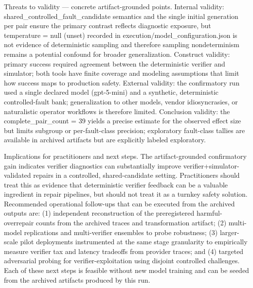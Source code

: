 \documentclass[conference]{IEEEtran}
\begin{document}
Threats to validity --- concrete artifact-grounded points. Internal validity: shared\_controlled\_fault\_candidate semantics and the single initial generation per pair ensure the primary contrast reflects diagnostic exposure, but temperature = null (unset) recorded in execution/model\_configuration.json is not evidence of deterministic sampling and therefore sampling nondeterminism remains a potential confound for broader generalization. Construct validity: primary success required agreement between the deterministic verifier and simulator; both tools have finite coverage and modeling assumptions that limit how success maps to production safety. External validity: the confirmatory run used a single declared model (gpt-5-mini) and a synthetic, deterministic controlled-fault bank; generalization to other models, vendor idiosyncrasies, or naturalistic operator workflows is therefore limited. Conclusion validity: the complete\_pair\_count = 39 yields a precise estimate for the observed effect size but limits subgroup or per-fault-class precision; exploratory fault-class tallies are available in archived artifacts but are explicitly labeled exploratory.

Implications for practitioners and next steps. The artifact-grounded confirmatory gain indicates verifier diagnostics can substantially improve verifier+simulator-validated repairs in a controlled, shared-candidate setting. Practitioners should treat this as evidence that deterministic verifier feedback can be a valuable ingredient in repair pipelines, but should not treat it as a turnkey safety solution. Recommended operational follow-ups that can be executed from the archived outputs are: (1) independent reconstruction of the preregistered harmful-overrepair counts from the archived traces and transformation artifact; (2) multi-model replications and multi-verifier ensembles to probe robustness; (3) larger-scale pilot deployments instrumented at the same stage granularity to empirically measure verifier tax and latency tradeoffs from provider traces; and (4) targeted adversarial probing for verifier-exploitation using disjoint controlled challenges. Each of these next steps is feasible without new model training and can be seeded from the archived artifacts produced by this run.
\end{document}
